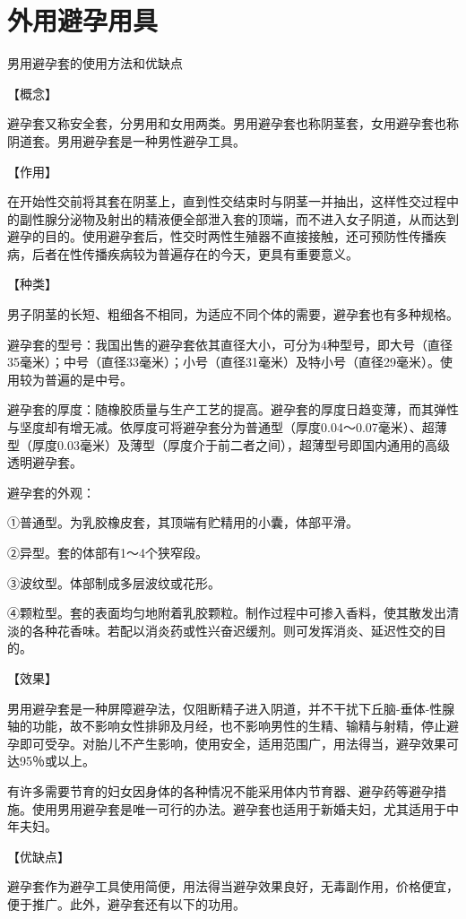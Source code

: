\documentclass[12pt,UTF8,openany]{ctexbook}
\begin{document}
\chapter{外用避孕用具}


男用避孕套的使用方法和优缺点


【概念】

避孕套又称安全套，分男用和女用两类。男用避孕套也称阴茎套，女用避孕套也称阴道套。男用避孕套是一种男性避孕工具。

【作用】

在开始性交前将其套在阴茎上，直到性交结束时与阴茎一并抽出，这样性交过程中的副性腺分泌物及射出的精液便全部泄入套的顶端，而不进入女子阴道，从而达到避孕的目的。使用避孕套后，性交时两性生殖器不直接接触，还可预防性传播疾病，后者在性传播疾病较为普遍存在的今天，更具有重要意义。

【种类】

男子阴茎的长短、粗细各不相同，为适应不同个体的需要，避孕套也有多种规格。

避孕套的型号：我国出售的避孕套依其直径大小，可分为4种型号，即大号（直径35毫米）；中号（直径33毫米）；小号（直径31毫米）及特小号（直径29毫米）。使用较为普遍的是中号。

避孕套的厚度：随橡胶质量与生产工艺的提高。避孕套的厚度日趋变薄，而其弹性与坚度却有增无减。依厚度可将避孕套分为普通型（厚度0.04～0.07毫米）、超薄型（厚度0.03毫米）及薄型（厚度介于前二者之间），超薄型号即国内通用的高级透明避孕套。

避孕套的外观：

①普通型。为乳胶橡皮套，其顶端有贮精用的小囊，体部平滑。

②异型。套的体部有1～4个狭窄段。

③波纹型。体部制成多层波纹或花形。

④颗粒型。套的表面均匀地附着乳胶颗粒。制作过程中可掺入香料，使其散发出清淡的各种花香味。若配以消炎药或性兴奋迟缓剂。则可发挥消炎、延迟性交的目的。

【效果】

男用避孕套是一种屏障避孕法，仅阻断精子进入阴道，并不干扰下丘脑-垂体-性腺轴的功能，故不影响女性排卵及月经，也不影响男性的生精、输精与射精，停止避孕即可受孕。对胎儿不产生影响，使用安全，适用范围广，用法得当，避孕效果可达95％或以上。

有许多需要节育的妇女因身体的各种情况不能采用体内节育器、避孕药等避孕措施。使用男用避孕套是唯一可行的办法。避孕套也适用于新婚夫妇，尤其适用于中年夫妇。

【优缺点】

避孕套作为避孕工具使用简便，用法得当避孕效果良好，无毒副作用，价格便宜，便于推广。此外，避孕套还有以下的功用。
\end{document}
